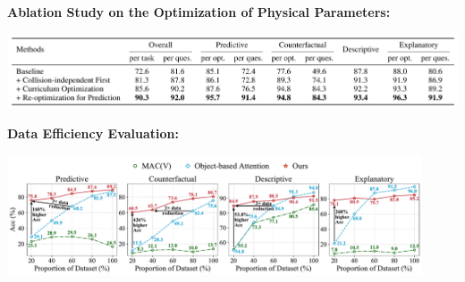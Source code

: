 \documentclass[landscape,a0paper,fontscale=0.292]{baposter}
\begin{document}
\begin{poster}
{\begin{minipage}[t]{0.62\textwidth}
\begin{center}
        \end{center}
        \vspace{-0.4em}
        \textbf{\color{blue}Ablation Study on the Optimization of Physical Parameters:} 
        \vspace{-0.8em}
        \begin{center}
            \includegraphics[width=\textwidth]{images/ablation.png}
        \end{center}
    \end{minipage}

	\vspace{0.4em}
    \textbf{\color{blue}Data Efficiency Evaluation:} 
    \vspace{-0.8em}
    \begin{center}
        \includegraphics[width=0.92\textwidth]{images/data_efficiency.pdf}
    \end{center}
	
}
\end{poster}
\end{document}
